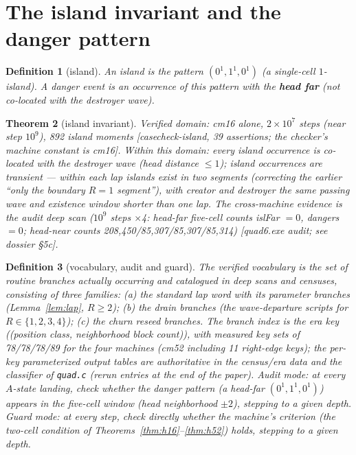 \documentclass[11pt]{amsart}
\newtheorem{theorem}{Theorem}[section]
\newtheorem{definition}[theorem]{Definition}
\begin{document}
\section{The island invariant and the danger pattern}

\begin{definition}[island]
An island is the pattern $(0^1,1^1,0^1)$ (a single-cell $1$-island). A danger event is an occurrence of this pattern with the \textbf{head far} (not co-located with the destroyer wave).
\end{definition}

\begin{theorem}[island invariant]\label{thm:island}
\emph{Verified domain: cm16 alone, $2\times10^7$ steps (near step $10^9$), 892 island moments} [casecheck-island, 39 assertions; the checker's machine constant is cm16]. Within this domain: every island occurrence is co-located with the destroyer wave (head distance $\le1$); island occurrences are transient --- within each lap islands exist in \emph{two} segments (correcting the earlier ``only the boundary $R{=}1$ segment''), with creator and destroyer the same passing wave and existence window shorter than one lap. The cross-machine evidence is the audit deep scan ($10^9$ steps $\times$4: head-far five-cell counts islFar $=0$, dangers $=0$; head-near counts 208,450/85,307/85,307/85,314) [quad6.exe audit; see dossier \S5c].
\end{theorem}

\begin{definition}[vocabulary, audit and guard]
The \emph{verified vocabulary} is the set of routine branches actually occurring and catalogued in deep scans and censuses, consisting of three families: (a) the standard lap word with its parameter branches (Lemma~\ref{lem:lap}, $R\ge2$); (b) the drain branches (the wave-departure scripts for $R\in\{1,2,3,4\}$); (c) the churn reseed branches. The branch index is the era key ((position class, neighborhood block count)), with measured key sets of 78/78/78/89 for the four machines (cm52 including 11 right-edge keys); the per-key parameterized output tables are authoritative in the census/era data and the classifier of \texttt{quad.c} (rerun entries at the end of the paper). \emph{Audit mode}: at every $A$-state landing, check whether the danger pattern (a head-far $(0^1,1^1,0^1)$) appears in the five-cell window (head neighborhood $\pm2$), stepping to a given depth. \emph{Guard mode}: at every step, check directly whether the machine's criterion (the two-cell condition of Theorems~\ref{thm:h16}--\ref{thm:h52}) holds, stepping to a given depth.
\end{definition}
\end{document}
